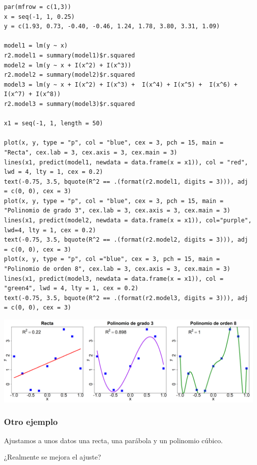 \begin{lstlisting}
par(mfrow = c(1,3))
x = seq(-1, 1, 0.25)
y = c(1.93, 0.73, -0.40, -0.46, 1.24, 1.78, 3.80, 3.31, 1.09)

model1 = lm(y ~ x)
r2.model1 = summary(model1)$r.squared
model2 = lm(y ~ x + I(x^2) + I(x^3))
r2.model2 = summary(model2)$r.squared
model3 = lm(y ~ x + I(x^2) + I(x^3) +  I(x^4) + I(x^5) +  I(x^6) + I(x^7) + I(x^8))
r2.model3 = summary(model3)$r.squared

x1 = seq(-1, 1, length = 50)

plot(x, y, type = "p", col = "blue", cex = 3, pch = 15, main = "Recta", cex.lab = 3, cex.axis = 3, cex.main = 3)
lines(x1, predict(model1, newdata = data.frame(x = x1)), col = "red", lwd = 4, lty = 1, cex = 0.2)
text(-0.75, 3.5, bquote(R^2 == .(format(r2.model1, digits = 3))), adj = c(0, 0), cex = 3)
plot(x, y, type = "p", col = "blue", cex = 3, pch = 15, main = "Polinomio de grado 3", cex.lab = 3, cex.axis = 3, cex.main = 3)
lines(x1, predict(model2, newdata = data.frame(x = x1)), col="purple", lwd=4, lty = 1, cex = 0.2)
text(-0.75, 3.5, bquote(R^2 == .(format(r2.model2, digits = 3))), adj = c(0, 0), cex = 3)
plot(x, y, type = "p", col ="blue", cex = 3, pch = 15, main = "Polinomio de orden 8", cex.lab = 3, cex.axis = 3, cex.main = 3)
lines(x1, predict(model3, newdata = data.frame(x = x1)), col = "green4", lwd = 4, lty = 1, cex = 0.2)
text(-0.75, 3.5, bquote(R^2 == .(format(r2.model3, digits = 3))), adj = c(0, 0), cex = 3)
\end{lstlisting}

\begin{center}
	\includegraphics[width=\linewidth]{"Temas/Imágenes/Tema 2/000020"}
\end{center}
\subsubsection*{Otro ejemplo}
Ajustamos a unos datos una recta, una parábola y un polinomio cúbico.

¿Realmente se mejora el ajuste?

